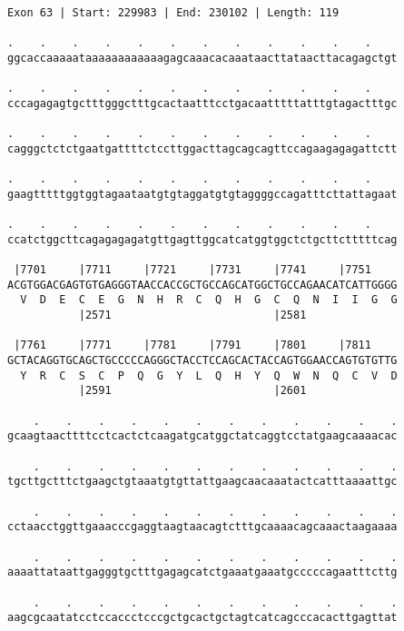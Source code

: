 \documentclass{article}
\begin{document}
\begin{Verbatim}
Exon 63 | Start: 229983 | End: 230102 | Length: 119
 
.    .    .    .    .    .    .    .    .    .    .    .    
ggcaccaaaaataaaaaaaaaaaagagcaaacacaaataacttataacttacagagctgt
  
.    .    .    .    .    .    .    .    .    .    .    .    
cccagagagtgctttgggctttgcactaatttcctgacaatttttatttgtagactttgc
  
.    .    .    .    .    .    .    .    .    .    .    .    
cagggctctctgaatgattttctccttggacttagcagcagttccagaagagagattctt
  
.    .    .    .    .    .    .    .    .    .    .    .    
gaagtttttggtggtagaataatgtgtaggatgtgtaggggccagatttcttattagaat
  
.    .    .    .    .    .    .    .    .    .    .    .    
ccatctggcttcagagagagatgttgagttggcatcatggtggctctgcttctttttcag
  
 |7701     |7711     |7721     |7731     |7741     |7751    
ACGTGGACGAGTGTGAGGGTAACCACCGCTGCCAGCATGGCTGCCAGAACATCATTGGGG
  V  D  E  C  E  G  N  H  R  C  Q  H  G  C  Q  N  I  I  G  G
           |2571                         |2581              
  
 |7761     |7771     |7781     |7791     |7801     |7811    
GCTACAGGTGCAGCTGCCCCCAGGGCTACCTCCAGCACTACCAGTGGAACCAGTGTGTTG
  Y  R  C  S  C  P  Q  G  Y  L  Q  H  Y  Q  W  N  Q  C  V  D
           |2591                         |2601              
  
    .    .    .    .    .    .    .    .    .    .    .    .
gcaagtaacttttcctcactctcaagatgcatggctatcaggtcctatgaagcaaaacac
  
    .    .    .    .    .    .    .    .    .    .    .    .
tgcttgctttctgaagctgtaaatgtgttattgaagcaacaaatactcatttaaaattgc
  
    .    .    .    .    .    .    .    .    .    .    .    .
cctaacctggttgaaacccgaggtaagtaacagtctttgcaaaacagcaaactaagaaaa
  
    .    .    .    .    .    .    .    .    .    .    .    .
aaaattataattgagggtgctttgagagcatctgaaatgaaatgcccccagaatttcttg
  
    .    .    .    .    .    .    .    .    .    .    .    .
aagcgcaatatcctccaccctcccgctgcactgctagtcatcagcccacacttgagttat
\end{Verbatim}
\newpage
\end{document}
